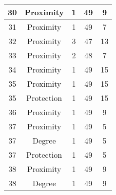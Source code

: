 \documentclass[results.tex]{subfiles}
\begin{document}
\begin{center}
\begin{tabular}{| c || c | c | c | c |}
            \hline
            30                      & Proximity                    & 1                      & 49                      & 9                    \\
            \hline
            31                      & Proximity                    & 1                      & 49                      & 7                    \\
            \hline
            32                      & Proximity                    & 3                      & 47                      & 13                   \\
            \hline
            33                      & Proximity                    & 2                      & 48                      & 7                    \\
            \hline
            34                      & Proximity                    & 1                      & 49                      & 15                   \\
            \hline
            35                      & Proximity                    & 1                      & 49                      & 15                   \\
            \hline
            35                      & Protection                   & 1                      & 49                      & 15                   \\
            \hline
            36                      & Proximity                    & 1                      & 49                      & 9                    \\
            \hline
            37                      & Proximity                    & 1                      & 49                      & 5                    \\
            \hline
            37                      & Degree                       & 1                      & 49                      & 5                    \\
            \hline
            37                      & Protection                   & 1                      & 49                      & 5                    \\
            \hline
            38                      & Proximity                    & 1                      & 49                      & 9                    \\
            \hline
            38                      & Degree                       & 1                      & 49                      & 9                    \\

\end{tabular}
\end{center}
\end{document}
